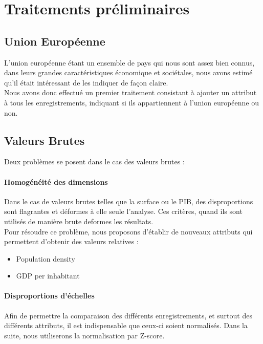 \section{Traitements préliminaires}

\subsection{Union Européenne}
L'union européenne étant un ensemble de pays qui nous sont assez bien connus, dans leurs grandes caractéristiques économique et sociétales, nous avons estimé qu'il était intéressant de les indiquer de façon claire.\\
Nous avons donc effectué un premier traitement consistant à ajouter un attribut à tous les enregistrements, indiquant si ils appartiennent à l'union européenne ou non.\\

\subsection{Valeurs Brutes}
Deux problèmes se posent dans le cas des valeurs brutes : 
\paragraph{Homogénéité des dimensions} Dans le cas de valeurs brutes telles que la surface ou le PIB, des disproportions sont flagrantes et déformes à elle seule l'analyse. Ces critères, quand ils sont utilisés de manière brute deformes les résultats.\\
Pour résoudre ce problème, nous proposons d'établir de nouveaux attributs qui permettent d'obtenir des valeurs relatives : 
\begin{itemize}
	\item Population density 
	\item GDP per inhabitant
\end{itemize}

\paragraph{Disproportions d'échelles}
Afin de permettre la comparaison des différents enregistrements, et surtout des différents attributs, il est indispensable que ceux-ci soient normalisés.
Dans la suite, nous utiliserons la normalisation par Z-score.







